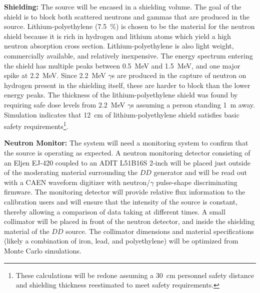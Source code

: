 {\bf Shielding:} The source will be encased in a shielding volume. The goal of the shield is to block both scattered neutrons and gammas that are produced in the source. Lithium-polyethylene (\SI{7.5}{\%}) is chosen to be the material for the neutron shield because it is rich in hydrogen and lithium atoms which yield a high neutron absorption cross section. Lithium-polyethylene is also light weight, commercially available, and relatively inexpensive. The energy spectrum entering the shield has multiple peaks between \SI{0.5}{\MeV} and \SI{1.5}{\MeV}, and one major spike at \SI{2.2}{\MeV}. Since \SI{2.2}{\MeV} $\gamma$s are produced in the capture of neutron on hydrogen present in the shielding itself, these are harder to block than the lower energy peaks. 
The thickness of the lithium-polyethylene shield was found by requiring safe dose levels from \SI{2.2}{\MeV} $\gamma$s assuming a person standing \SI{1}{\m} away.
Simulation indicates that \SI{12}{\cm} of lithium-polyethylene shield satisfies basic safety requirements\footnote{These calculations will be redone assuming a \SI{30}{\cm} personnel safety distance and shielding thickness reestimated to meet  safety requirements.}. 

{\bf Neutron Monitor:} The system will need a monitoring system to confirm that the source is operating as expected.  A neutron monitoring detector consisting of an Eljen EJ-420 coupled to an ADIT L51B16S \num{2}-inch  will be placed just outside of the moderating material surrounding the $DD$ generator and will be read out with a CAEN waveform digitizer with neutron/$\gamma$ pulse-shape discriminating firmware. The monitoring detector will provide relative flux information to the calibration users and will ensure that the intensity of the source is constant, thereby allowing a comparison of data taking at different times.  A small collimator will be placed in front of the neutron detector, and inside the shielding material of the $DD$ source. The collimator dimensions and material specifications (likely a combination of iron, lead, and polyethylene) will be optimized from Monte Carlo simulations.

